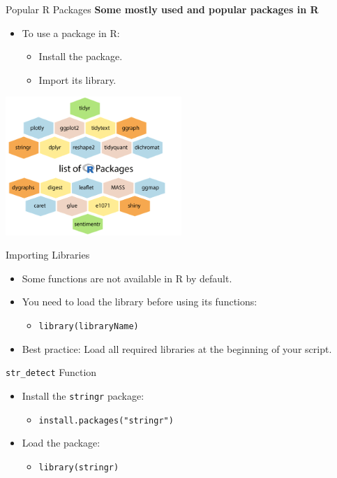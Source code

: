 \documentclass{beamer}
\begin{document}
\begin{frame}{Popular R Packages}
    \textbf{Some mostly used and popular packages in R}
    \begin{itemize}
        \item To use a package in R:
        \begin{itemize}
            \item Install the package.
            \item Import its library.
        \end{itemize}
    \end{itemize}
    \centering
    \includegraphics[width=0.5\textwidth]{3611_p8.png} %
\end{frame}  %

\begin{frame}{Importing Libraries}
    \begin{itemize}
        \item Some functions are not available in R by default.
        \item You need to load the library before using its functions:
        \begin{itemize}
            \item \texttt{library(libraryName)}
        \end{itemize}
        \item Best practice: Load all required libraries at the beginning of your script.
    \end{itemize}
\end{frame}

\begin{frame}{\texttt{str\_detect} Function}
    \begin{itemize}
        \item Install the \texttt{stringr} package:
        \begin{itemize}
            \item \texttt{install.packages("stringr")}
        \end{itemize}
        \item Load the package:
        \begin{itemize}
            \item \texttt{library(stringr)}
        \end{itemize}
    \end{itemize}
\end{frame}
\end{document}
